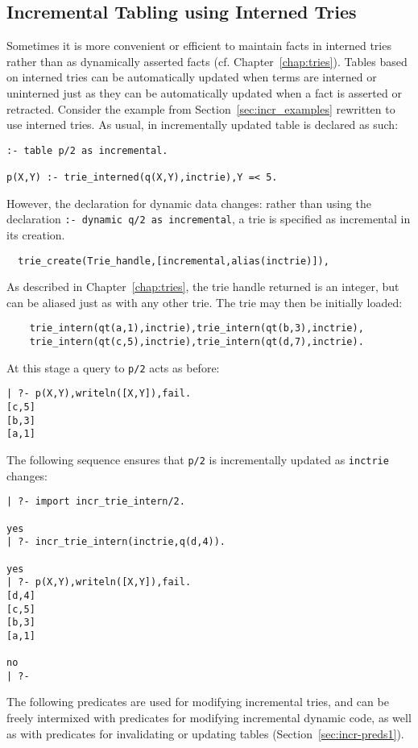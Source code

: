 \subsection{Incremental Tabling using Interned Tries} \label{sec:incr-update-tries}
%
Sometimes it is more convenient or efficient to maintain facts in
interned tries rather than as dynamically asserted facts
(cf. Chapter~\ref{chap:tries}).  Tables based on interned tries can be
automatically updated when terms are interned or uninterned just as
they can be automatically updated when a fact is asserted or
retracted.  Consider the example from Section~\ref{sec:incr_examples}
rewritten to use interned tries.  As usual, in incrementally updated
table is declared as such:
%
\begin{verbatim}
:- table p/2 as incremental.

p(X,Y) :- trie_interned(q(X,Y),inctrie),Y =< 5.
\end{verbatim}
%
However, the declaration for dynamic data changes: rather than using
the declaration {\tt :- dynamic q/2 as incremental}, a trie is
specified as incremental in its creation.
%
\begin{verbatim}
  trie_create(Trie_handle,[incremental,alias(inctrie)]),
\end{verbatim}
%
As described in Chapter~\ref{chap:tries}, the trie handle returned is
an integer, but can be aliased just as with any other trie.  The trie
may then be initially loaded:
%
\begin{verbatim}
	trie_intern(qt(a,1),inctrie),trie_intern(qt(b,3),inctrie),
	trie_intern(qt(c,5),inctrie),trie_intern(qt(d,7),inctrie).
\end{verbatim}
%
At this stage a query to {\tt p/2} acts as before:
%
\begin{verbatim}
| ?- p(X,Y),writeln([X,Y]),fail.
[c,5]
[b,3]
[a,1]
\end{verbatim}
%
The following sequence ensures that {\tt p/2} is incrementally updated
as {\tt inctrie} changes:
%
\begin{verbatim}
| ?- import incr_trie_intern/2.

yes
| ?- incr_trie_intern(inctrie,q(d,4)).

yes
| ?- p(X,Y),writeln([X,Y]),fail.
[d,4]
[c,5]
[b,3]
[a,1]

no
| ?- 
\end{verbatim}
%

The following predicates are used for modifying incremental tries, and
can be freely intermixed with predicates for modifying incremental
dynamic code, as well as with predicates for invalidating or updating
tables (Section~\ref{sec:incr-preds1}).

